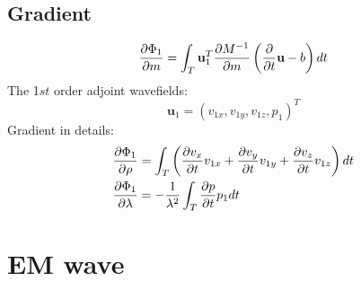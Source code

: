 \documentclass[pdftex,a4paper,parskip,listof=totoc,bibliography=totoc,onehalfspacing,12pt]{scrreprt}
\begin{document}
\section{Gradient}
\begin{equation}
 \pdv{\Phi_1}{m}=\int_T \mathbf{u}_1^T \pdv{M^{-1}}{m}\left( \pdv{}{t}\mathbf{u}-b \right)dt
\end{equation}
The 1$st$ order adjoint wavefields:
\begin{equation}
\mathbf{ u}_1=\left(v_{1x},v_{1y},v_{1z},p_1\right)^T
\end{equation}
Gradient in details:
\begin{align}
 \pdv{\Phi_1}{\rho}&= \int_T \left( \pdv{v_x}{t} v_{1x} + \pdv{v_y}{t} v_{1y} + \pdv{v_z}{t} v_{1z} \right) dt\\
 \pdv{\Phi_1}{\lambda}&=- \frac{1}{\lambda^2}\int_T  \pdv{p}{t}p_1 dt \\
\end{align}

\chapter{EM wave}
\label{sec:EM_wave_equation}
\end{document}

